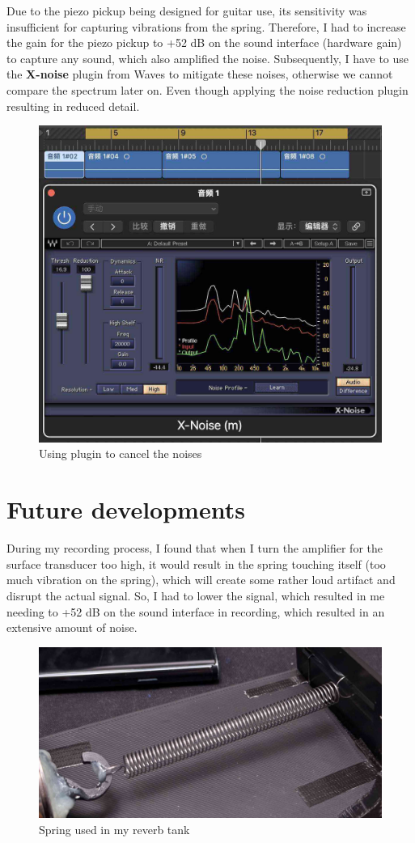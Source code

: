 \documentclass[11pt,a4paper]{article}
\begin{document}
Due to the piezo pickup being designed for guitar use, its sensitivity was insufficient for capturing vibrations from the spring. Therefore, I had to increase the gain for the piezo pickup to +52 dB on the sound interface (hardware gain) to capture any sound, which also amplified the noise. Subsequently, I have to use the \textbf{X-noise} plugin from Waves to mitigate these noises, otherwise we cannot compare the spectrum later on. Even though applying the noise reduction plugin resulting in reduced detail.


\begin{figure}[h]
\center
	\includegraphics[width=0.5\linewidth]{photos/xnoise.jpg}
	\caption{Using plugin to cancel the noises}
\end{figure}


\section{Future developments}

During my recording process, I found that when I turn the amplifier for the surface transducer too high, it would result in the spring touching itself (too much vibration on the spring), which will create some rather loud artifact and disrupt the actual signal. So, I had to lower the signal, which resulted in me needing to +52 dB on the sound interface in recording, which resulted in an extensive amount of noise. 

\begin{figure}[h] 
	\center 
	\includegraphics[width=0.5\linewidth]{photos/spring.jpg} 
	\caption{Spring used in my reverb tank} 
\end{figure} 
\end{document}

